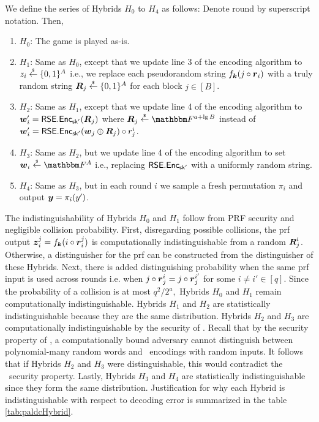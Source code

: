 \begin{IEEEproof}
    We define the series of Hybrids $H_0$ to $H_4$ as follows:
    Denote round by superscript notation. Then,
    \begin{enumerate}
    \item $H_0$: The game is played as-is.
    \item $H_1$: Same as $H_0$, except that we update line 3 of the encoding algorithm to  $z_i \overset{{\scriptscriptstyle\$}}{\leftarrow} \{0,1\}^{A}$ i.e., we replace each pseudorandom string $f_{\boldsymbol{k}}(j \circ \boldsymbol{r}_i)$ with a truly random string ${\boldsymbol{R}_j \overset{{\scriptscriptstyle\$}}{\leftarrow} \{0,1\}^{A}}$ for each block $j \in [B]$.
    \item $H_2$: Same as $H_1$, except that we update line 4 of the encoding algorithm to $\boldsymbol{w}_i'={\mathsf{RSE}.\mathsf{Enc}_{\mathsf{sk}'}(\boldsymbol{R}_j)}$ where $\bR_j \unif \F^{a + \lg B}$ instead of $\boldsymbol{w}_i'={\mathsf{RSE}.\mathsf{Enc}_{\mathsf{sk}'} (\boldsymbol{w}_j \oplus \boldsymbol{R}_j) \circ r_j^i}$.
    \item $H_3$: Same as $H_2$, but we update line 4 of the encoding algorithm to set $\bw_i\unif \F^A$ i.e., replacing $\mathsf{RSE}.\mathsf{Enc}_{\mathsf{sk}'}$ with a uniformly random string.
    \item $H_4$: Same as $H_3$, but in each round $i$ we sample a fresh permutation $\pi_i$ and output $\boldsymbol{y} = \pi_i(y')$. 
    \end{enumerate}
The indistinguishability of Hybrids $H_0$ and $H_1$ follow from PRF security and negligible collision probability.
First, disregarding possible collisions, the prf output $\boldsymbol{z}_i^j = f_{\boldsymbol{k}}(i \circ \boldsymbol{r}_i^j)$ is computationally indistinguishable from a random $\boldsymbol{R}_j^i$.
Otherwise, a distinguisher for the prf can be constructed from the distinguisher of these Hybrids.
Next, there is added distinguishing probability when the same prf input is used across rounds i.e. when $j \circ \boldsymbol{r}_j^i = j \circ \boldsymbol{r}_j^{i'}$ for some $i \neq i' \in [q].$
Since the probability of a collision is at most $q^2/ 2^a,$ Hybrids $H_0$ and $H_1$ remain computationally indistinguishable.
Hybrids $H_1$ and $H_2$ are statistically indistinguishable because they are the same distribution.
Hybrids $H_2$ and $H_3$ are computationally indistinguishable by the security of \RSE. 
Recall that by the security property of \RSE, a computationally bound adversary cannot distinguish between polynomial-many random words and \RSE\ encodings with random inputs.
It follows that if Hybrids $H_2$ and $H_3$ were distinguishable, this would contradict the \RSE\ security property.
Lastly, Hybrids $H_3$ and $H_4$ are statistically indistinguishable since they form the same distribution. 
Justification for why each Hybrid is indistinguishable with respect to decoding error is summarized in the table \ref{tab:paldcHybrid}.


\end{IEEEproof}
